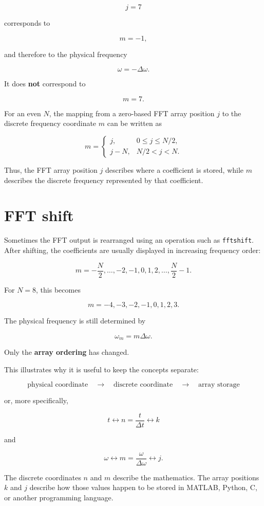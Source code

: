 \documentclass[11pt]{article}
\begin{document}
\[
j=7
\]

corresponds to

\[
m=-1,
\]

and therefore to the physical frequency

\[
\omega=-\Delta\omega.
\]

It does \textbf{not} correspond to

\[
m=7.
\]

For an even $N$, the mapping from a zero-based FFT array position $j$ to the
discrete frequency coordinate $m$ can be written as

\[
m=
\begin{cases}
j, & 0\leq j\leq N/2, \\[2mm]
j-N, & N/2<j<N.
\end{cases}
\]

Thus, the FFT array position $j$ describes where a coefficient is stored,
while $m$ describes the discrete frequency represented by that coefficient.

\section*{FFT shift}

Sometimes the FFT output is rearranged using an operation such as
\texttt{fftshift}. After shifting, the coefficients are usually displayed
in increasing frequency order:

\[
m=
-\frac{N}{2},
\ldots,
-2,
-1,
0,
1,
2,
\ldots,
\frac{N}{2}-1.
\]

For $N=8$, this becomes

\[
m=
-4,-3,-2,-1,0,1,2,3.
\]

The physical frequency is still determined by

\[
\omega_m=m\Delta\omega.
\]

Only the \textbf{array ordering} has changed.

This illustrates why it is useful to keep the concepts separate:

\[
\boxed{
\text{physical coordinate}
\quad\longrightarrow\quad
\text{discrete coordinate}
\quad\longrightarrow\quad
\text{array storage}
}
\]

or, more specifically,

\[
\boxed{
t
\longleftrightarrow
n=\frac{t}{\Delta t}
\longleftrightarrow
k
}
\]

and

\[
\boxed{
\omega
\longleftrightarrow
m=\frac{\omega}{\Delta\omega}
\longleftrightarrow
j.
}
\]

The discrete coordinates $n$ and $m$ describe the mathematics.
The array positions $k$ and $j$ describe how those values happen to be
stored in MATLAB, Python, C, or another programming language.
\end{document}
